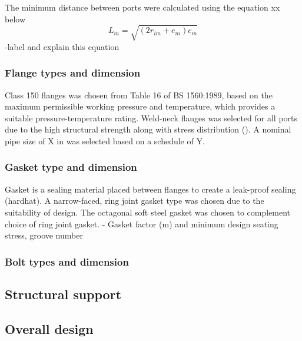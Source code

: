 



The minimum distance between ports were calculated using the equation xx below
\begin{equation}
    L_m = \sqrt{(2r_{im}+e_{m})e_m}
\end{equation}
-label and explain this equation

\subsubsection{Flange types and dimension}
Class 150 flanges was chosen from Table 16 of BS 1560:1989, based on the maximum permissible working pressure and temperature, which provides a suitable pressure-temperature rating. Weld-neck flanges was selected for all ports due to the high structural strength along with stress distribution ().
A nominal pipe size of X in was selected based on a schedule of Y. 
\subsubsection{Gasket type and dimension}
Gasket is a sealing material placed between flanges to create a leak-proof sealing (hardhat). A narrow-faced, ring joint gasket type was chosen due to the suitability of design. The octagonal soft steel gasket was chosen to complement choice of ring joint gasket. 
- Gasket factor (m) and minimum design seating stress, groove number

\subsubsection{Bolt types and dimension}
\subsection{Structural support}
\subsection{Overall design}

